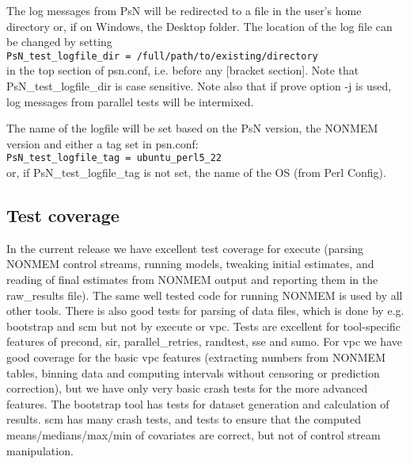 The log messages from PsN will be redirected to a file in the user's home directory or, if on Windows, the
Desktop folder. The location of the log file can be changed by setting\\
\verb|PsN_test_logfile_dir = /full/path/to/existing/directory| \\
in the top section of psn.conf, i.e. before any [bracket section].
Note that PsN\_test\_logfile\_dir is case sensitive. Note also that if prove option -j is used, log messages from
parallel tests will be intermixed.

The name of the logfile will be set based on the PsN version, the NONMEM version and
either a tag set in psn.conf:\\
\verb|PsN_test_logfile_tag = ubuntu_perl5_22| \\
or, if PsN\_test\_logfile\_tag is not set, the name of the OS (from Perl Config).

\subsection{Test coverage}
In the current release we have excellent test coverage for execute (parsing NONMEM control streams,
running models, tweaking initial estimates, and reading of final estimates from NONMEM output and reporting
them in the raw\_results file).
The same well tested code for running NONMEM is used by all other tools.
There is also good tests for parsing of data files, which is done by e.g. bootstrap and scm but not by execute or
vpc.
Tests are excellent for tool-specific features of precond, sir, parallel\_retries, randtest, sse and sumo.
For vpc we have good coverage for the basic vpc features (extracting numbers from NONMEM tables, binning data and
computing intervals without censoring or prediction correction), but we have only very basic crash tests for the
more advanced features. The bootstrap tool has tests for dataset generation and calculation of results.
scm has many crash tests, and tests to ensure that the computed means/medians/max/min of covariates are correct,
but not of control stream manipulation.

